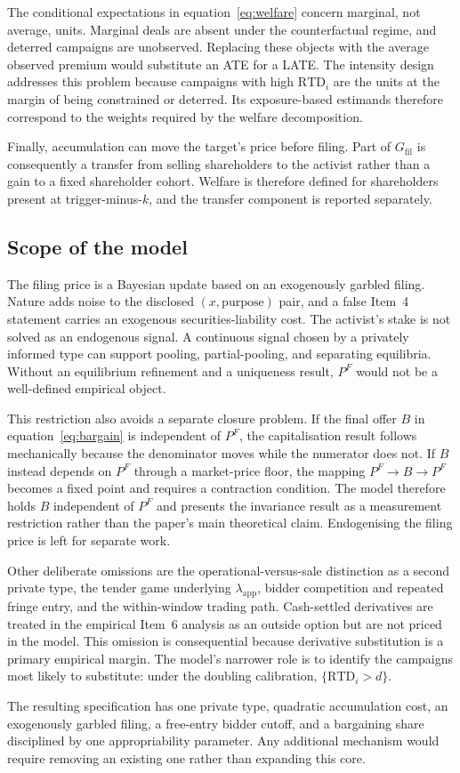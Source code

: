 The conditional expectations in equation~\eqref{eq:welfare} concern marginal,
not average, units. Marginal deals are absent under the counterfactual regime,
and deterred campaigns are unobserved. Replacing these objects with the average
observed premium would substitute an ATE for a LATE. The intensity design
addresses this problem because campaigns with high $\mathrm{RTD}_i$ are the
units at the margin of being constrained or deterred. Its exposure-based
estimands therefore correspond to the weights required by the welfare
decomposition.

Finally, accumulation can move the target's price before filing. Part of
$G_{\mathrm{fil}}$ is consequently a transfer from selling shareholders to the
activist rather than a gain to a fixed shareholder cohort. Welfare is therefore
defined for shareholders present at trigger-minus-$k$, and the transfer
component is reported separately.

\subsection{Scope of the model}
\label{sec:model-omitted}

The filing price is a Bayesian update based on an exogenously garbled filing.
Nature adds noise to the disclosed $(x,\text{purpose})$ pair, and a false Item~4
statement carries an exogenous securities-liability cost. The activist's stake
is not solved as an endogenous signal. A continuous signal chosen by a privately
informed type can support pooling, partial-pooling, and separating equilibria.
Without an equilibrium refinement and a uniqueness result, $P^F$ would not be
a well-defined empirical object.

This restriction also avoids a separate closure problem. If the final offer
$B$ in equation~\eqref{eq:bargain} is independent of $P^F$, the capitalisation
result follows mechanically because the denominator moves while the numerator
does not. If $B$ instead depends on $P^F$ through a market-price floor, the
mapping $P^F\to B\to P^F$ becomes a fixed point and requires a contraction
condition. The model therefore holds $B$ independent of $P^F$ and presents the
invariance result as a measurement restriction rather than the
paper's main theoretical claim. Endogenising the filing price is left for
separate work.

Other deliberate omissions are the operational-versus-sale distinction as a
second private type, the tender game underlying $\lambda_{\mathrm{app}}$,
bidder competition and repeated fringe entry, and the within-window trading
path. Cash-settled derivatives are treated in the empirical Item~6 analysis as
an outside option but are not priced in the model. This omission is
consequential because derivative substitution is a primary empirical margin.
The model's narrower role is to identify the campaigns most likely to
substitute: under the doubling calibration, $\{\mathrm{RTD}_i>d\}$.

The resulting specification has one private type, quadratic accumulation cost,
an exogenously garbled filing, a free-entry bidder cutoff, and a bargaining
share disciplined by one appropriability parameter. Any additional mechanism
would require removing an existing one rather than expanding this core.

